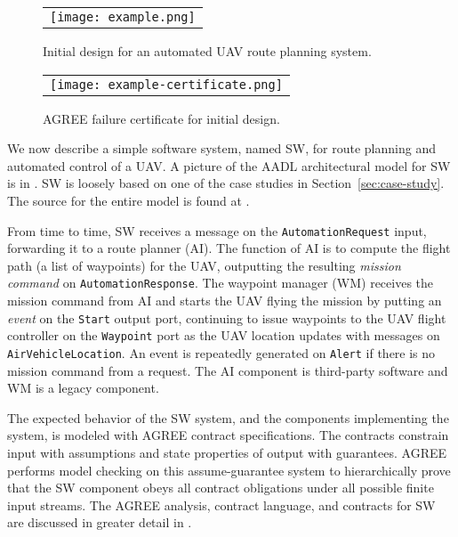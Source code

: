 \begin{figure*}[h]
  \begin{center}
    \begin{tabular}{c}
      \texttt{[image: example.png]}
    \end{tabular}
  \end{center}
\caption{Initial design for an automated UAV route planning system.}
\label{fig:example}
\end{figure*}

\begin{figure}
  \begin{center}
    \begin{tabular}{c}
      \texttt{[image: example-certificate.png]} \\
    \end{tabular}
  \end{center}
\caption{AGREE failure certificate for initial design.}
\label{fig:example-certificate}
\end{figure}

We now describe a simple software system, named SW, for route planning
and automated control of a UAV. A picture of the AADL architectural
model for SW is in . SW is loosely based on one of
the case studies in Section~\ref{sec:case-study}.  The source for the
entire model is found at \cite{repo}.

From time to time, SW receives a message on the \texttt{AutomationRequest} input,
forwarding it to a route planner (AI). The function of AI is to 
compute the flight path (a list of waypoints) for the UAV, outputting
the resulting \emph{mission command} on \texttt{AutomationResponse}.
The waypoint manager (WM) receives the mission command from AI and
starts the UAV flying the mission by putting an \emph{event} on the
\texttt{Start} output port, continuing to issue waypoints to the UAV
flight controller on the \texttt{Waypoint} port as the UAV location
updates with messages on \texttt{AirVehicleLocation}.
An event is repeatedly generated on \texttt{Alert} if there is no
mission command from a request. The AI component is third-party
software and WM is a legacy component.


The expected behavior of the SW system, and the components
implementing the system, is modeled with AGREE contract
specifications.  The contracts constrain input with assumptions and
state properties of output with guarantees.  AGREE performs model
checking on this assume-guarantee system to hierarchically prove that
the SW component obeys all contract obligations under all possible
finite input streams.  The AGREE analysis, contract language, and
contracts for SW are discussed in greater detail in
.

